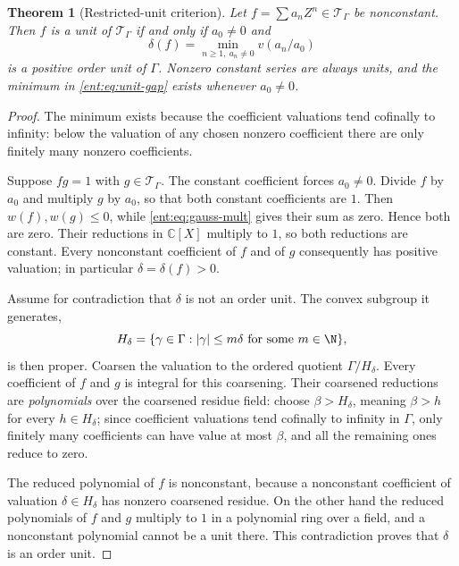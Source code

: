 \documentclass[11pt]{article}
\newtheorem{theorem}{Theorem}[section]
\theoremstyle{plain}
\theoremstyle{plain}
\theoremstyle{plain}
\theoremstyle{definition}
\theoremstyle{definition}
\theoremstyle{definition}
\theoremstyle{definition}
\theoremstyle{remark}
\newcommand{\C}{\mathbb C}\newcommand{\R}{\mathbb R}
\newcommand{\TT}{\mathcal T_\Gamma}
\begin{document}
\begin{theorem}[Restricted-unit criterion]\label{ent:thm:units}
Let $f=\sum a_nZ^n\in\TT$ be nonconstant. Then $f$ is a unit of $\TT$ if and
only if $a_0\ne0$ and
\begin{equation}\label{ent:eq:unit-gap}
 \delta(f)=\min_{n\ge1,\ a_n\ne0}v(a_n/a_0)
\end{equation}
is a positive order unit of $\Gamma$. Nonzero constant series are always
units, and the minimum in \eqref{ent:eq:unit-gap} exists whenever $a_0\ne0$.
\end{theorem}
\begin{proof}
The minimum exists because the coefficient valuations tend cofinally to
infinity: below the valuation of any chosen nonzero coefficient there are
only finitely many nonzero coefficients.

Suppose $fg=1$ with $g\in\TT$. The constant coefficient forces $a_0\ne0$.
Divide $f$ by $a_0$ and multiply $g$ by $a_0$, so that both constant
coefficients are $1$. Then $w(f),w(g)\le0$, while \eqref{ent:eq:gauss-mult}
gives their sum as zero. Hence both are zero. Their reductions in $\C[X]$
multiply to $1$, so both reductions are constant. Every nonconstant
coefficient of $f$ and of $g$ consequently has positive valuation; in
particular $\delta=\delta(f)>0$.

Assume for contradiction that $\delta$ is not an order unit. The convex
subgroup it generates,
\begin{equation}\label{ent:eq:Hdelta}
 H_\delta=\{\gamma\in\Gamma:|\gamma|\le m\delta
                       \text{ for some }m\in\N\},
\end{equation}
is then proper. Coarsen the valuation to the ordered quotient
$\Gamma/H_\delta$. Every coefficient of $f$ and $g$ is integral for this
coarsening. Their coarsened reductions are \emph{polynomials} over the
coarsened residue field: choose $\beta>H_\delta$, meaning $\beta>h$ for every
$h\in H_\delta$; since coefficient valuations tend cofinally to infinity in
$\Gamma$, only finitely many coefficients can have value at most $\beta$, and
all the remaining ones reduce to zero.

The reduced polynomial of $f$ is nonconstant, because a nonconstant
coefficient of valuation $\delta\in H_\delta$ has nonzero coarsened residue.
On the other hand the reduced polynomials of $f$ and $g$ multiply to $1$ in a
polynomial ring over a field, and a nonconstant polynomial cannot be a unit
there. This contradiction proves that $\delta$ is an order unit.


\end{proof}
\end{document}

